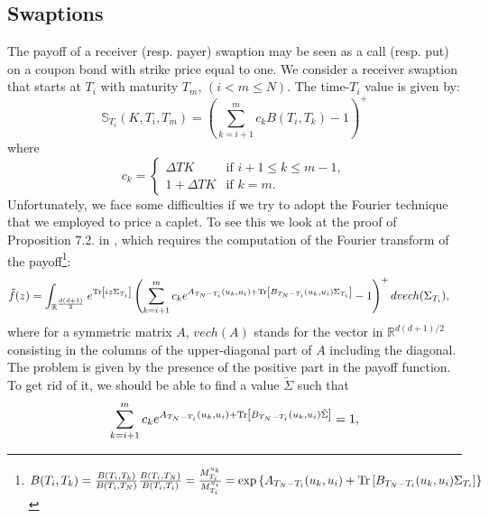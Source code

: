  
\subsection{Swaptions}
The payoff of a receiver (resp. payer) swaption may be seen as a call (resp. put) on a coupon bond with strike price equal to one. We consider a receiver swaption that starts at $T_{i}$ with maturity $T_{m}$, $(i<m\leq N)$. The time-$T_{i}$ value is given by:
\begin{equation}
\mathbb{S}_{T_{i}}(K,T_{i},T_{m})=\left(\sum_{k=i+1}^{m}{c_{k}B(T_{i},T_{k})}-1 \right)^{+}
\end{equation}
where
\begin{equation}
c_{k} = \left\{
\begin{array}{ll}
\Delta TK & \text{if } i+1\leq k \leq m-1,\\
1+\Delta TK & \text{if } k=m.
\end{array} \right.
\end{equation}
Unfortunately, we face some difficulties if we try to adopt the Fourier technique that we employed to price a caplet. To see this we look at the proof of Proposition 7.2. in \cite{article_KRPT2009}, which requires the computation of the Fourier transform of the payoff\footnote{$B(T_{i},T_{k})=\frac{B(T_{i},T_{k})}{B(T_{i},T_{N})}\frac{B(T_{i},T_{N})}{B(T_{i},T_{i})}=\frac{M^{u_k}_{T_i}}{M^{u_i}_{T_i}}=\exp\left\{A_{T_N-T_i}(u_k,u_{i})+\textup{Tr}\left[B_{T_N-T_i}(u_k,u_{i})\Sigma_{T_i}\right]\right\}$}:
\begin{align}
\tilde{f}(z)&=\int_{\mathbb{R}^{\frac{d(d+1)}{2}}}{e^{\textup{Tr}\left[iz\Sigma_{T_i}\right]}\left(\sum_{k=i+1}^{m}{c_{k}e^{A_{T_N-T_i}(u_k,u_{i})+\textup{Tr}\left[B_{T_N-T_i}(u_k,u_{i})\Sigma_{T_i} \right]}} -1\right)^{+}dvech(\Sigma_{T_i})},
\end{align}
where for a symmetric matrix $A$, $vech(A)$ stands for the vector in $\mathbb{R}^{d(d+1)/2}$ consisting in the columns of the upper-diagonal part of $A$
including the diagonal.
The problem is given by the presence of the positive part in the payoff function. To get rid of it, we should be able to find a value $\tilde{\Sigma}$ such that
\begin{equation}
\sum_{k=i+1}^{m}{c_{k}e^{A_{T_N-T_i}(u_k,u_{i})+\textup{Tr}\left[B_{T_N-T_i}(u_k,u_{i})\tilde{\Sigma} \right]}}=1, \label{findBound}
\end{equation}
